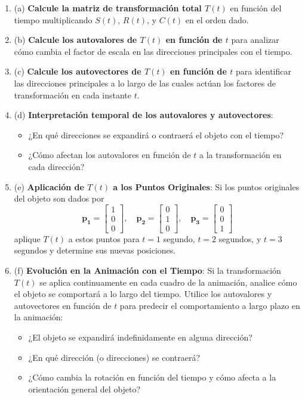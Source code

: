 \documentclass{article}
\begin{document}
\begin{enumerate}
    \item (a) \textbf{Calcule la matriz de transformación total \( T(t) \)} en función del tiempo multiplicando \( S(t) \), \( R(t) \), y \( C(t) \) en el orden dado.

    \item (b) \textbf{Calcule los autovalores de \( T(t) \) en función de \( t \)} para analizar cómo cambia el factor de escala en las direcciones principales con el tiempo.

    \item (c) \textbf{Calcule los autovectores de \( T(t) \) en función de \( t \)} para identificar las direcciones principales a lo largo de las cuales actúan los factores de transformación en cada instante \( t \).

    \item (d) \textbf{Interpretación temporal de los autovalores y autovectores}:
        \begin{itemize}
            \item ¿En qué direcciones se expandirá o contraerá el objeto con el tiempo?
            \item ¿Cómo afectan los autovalores en función de \( t \) a la transformación en cada dirección?
        \end{itemize}

    \item (e) \textbf{Aplicación de \( T(t) \) a los Puntos Originales}: Si los puntos originales del objeto son dados por
    \[
    \mathbf{p_1} = \begin{bmatrix} 1 \\ 0 \\ 0 \end{bmatrix}, \quad \mathbf{p_2} = \begin{bmatrix} 0 \\ 1 \\ 0 \end{bmatrix}, \quad \mathbf{p_3} = \begin{bmatrix} 0 \\ 0 \\ 1 \end{bmatrix}
    \]
    aplique \( T(t) \) a estos puntos para \( t = 1 \) segundo, \( t = 2 \) segundos, y \( t = 3 \) segundos y determine sus nuevas posiciones.

    \item (f) \textbf{Evolución en la Animación con el Tiempo}: Si la transformación \( T(t) \) se aplica continuamente en cada cuadro de la animación, analice cómo el objeto se comportará a lo largo del tiempo. Utilice los autovalores y autovectores en función de \( t \) para predecir el comportamiento a largo plazo en la animación:
    \begin{itemize}
        \item ¿El objeto se expandirá indefinidamente en alguna dirección?
        \item ¿En qué dirección (o direcciones) se contraerá?
        \item ¿Cómo cambia la rotación en función del tiempo y cómo afecta a la orientación general del objeto?
    \end{itemize}
\end{enumerate}
\end{document}
